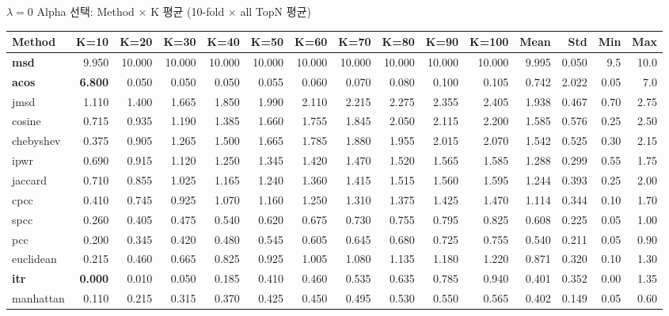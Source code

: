 \documentclass[aspectratio=169,10pt]{beamer}
\begin{document}
\begin{frame}[shrink=12]{$\lambda=0$ Alpha 선택: Method $\times$ K 평균 \textnormal{\small(10-fold $\times$ all TopN 평균)}}
	\begin{center}
	\renewcommand{\arraystretch}{1.1}
	\scriptsize
	\begin{tabular}{l|rrrrrrrrrr|rrrr}
		\toprule
		Method & K=10 & K=20 & K=30 & K=40 & K=50 & K=60 & K=70 & K=80 & K=90 & K=100 & Mean & Std & Min & Max \\
		\midrule
		\textbf{msd}   & 9.950 & 10.000 & 10.000 & 10.000 & 10.000 & 10.000 & 10.000 & 10.000 & 10.000 & 10.000 & 9.995 & 0.050 & 9.5 & 10.0 \\
		\textbf{acos}  & \textbf{6.800} & 0.050 & 0.050 & 0.050 & 0.055 & 0.060 & 0.070 & 0.080 & 0.100 & 0.105 & 0.742 & 2.022 & 0.05 & 7.0 \\
		jmsd  & 1.110 & 1.400 & 1.665 & 1.850 & 1.990 & 2.110 & 2.215 & 2.275 & 2.355 & 2.405 & 1.938 & 0.467 & 0.70 & 2.75 \\
		cosine & 0.715 & 0.935 & 1.190 & 1.385 & 1.660 & 1.755 & 1.845 & 2.050 & 2.115 & 2.200 & 1.585 & 0.576 & 0.25 & 2.50 \\
		chebyshev & 0.375 & 0.905 & 1.265 & 1.500 & 1.665 & 1.785 & 1.880 & 1.955 & 2.015 & 2.070 & 1.542 & 0.525 & 0.30 & 2.15 \\
		ipwr  & 0.690 & 0.915 & 1.120 & 1.250 & 1.345 & 1.420 & 1.470 & 1.520 & 1.565 & 1.585 & 1.288 & 0.299 & 0.55 & 1.75 \\
		jaccard & 0.710 & 0.855 & 1.025 & 1.165 & 1.240 & 1.360 & 1.415 & 1.515 & 1.560 & 1.595 & 1.244 & 0.393 & 0.25 & 2.00 \\
		cpcc  & 0.410 & 0.745 & 0.925 & 1.070 & 1.160 & 1.250 & 1.310 & 1.375 & 1.425 & 1.470 & 1.114 & 0.344 & 0.10 & 1.70 \\
		spcc  & 0.260 & 0.405 & 0.475 & 0.540 & 0.620 & 0.675 & 0.730 & 0.755 & 0.795 & 0.825 & 0.608 & 0.225 & 0.05 & 1.00 \\
		pcc   & 0.200 & 0.345 & 0.420 & 0.480 & 0.545 & 0.605 & 0.645 & 0.680 & 0.725 & 0.755 & 0.540 & 0.211 & 0.05 & 0.90 \\
		euclidean & 0.215 & 0.460 & 0.665 & 0.825 & 0.925 & 1.005 & 1.080 & 1.135 & 1.180 & 1.220 & 0.871 & 0.320 & 0.10 & 1.30 \\
		\textbf{itr}  & \textbf{0.000} & 0.010 & 0.050 & 0.185 & 0.410 & 0.460 & 0.535 & 0.635 & 0.785 & 0.940 & 0.401 & 0.352 & 0.00 & 1.35 \\
		manhattan & 0.110 & 0.215 & 0.315 & 0.370 & 0.425 & 0.450 & 0.495 & 0.530 & 0.550 & 0.565 & 0.402 & 0.149 & 0.05 & 0.60 \\

\end{tabular}
\end{center}
\end{frame}
\end{document}
